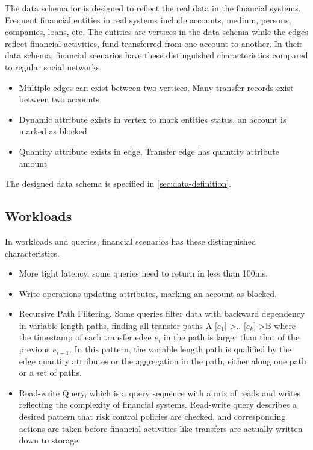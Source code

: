 The data schema for \ldbcfinbench is designed to reflect the real data in the financial systems. Frequent
financial entities in real systems include accounts, medium, persons, companies, loans, etc. The
entities are vertices in the data schema while the edges reflect financial activities, \eg fund transferred
from one account to another. In their data schema, financial scenarios have these distinguished characteristics
compared to regular social networks.
\begin{itemize}
    \item Multiple edges can exist between two vertices, \eg Many transfer records exist between two accounts
    \item Dynamic attribute exists in vertex to mark entities status, \eg an account is marked as blocked
    \item Quantity attribute exists in edge, \eg Transfer edge has quantity attribute amount
\end{itemize}

The designed data schema is specified in \autoref{sec:data-definition}.

\subsection{Workloads}

In workloads and queries, financial scenarios has these distinguished characteristics.
\begin{itemize}
    \item More tight latency, \eg some queries need to return in less than 100ms.
    \item Write operations updating attributes, \eg marking an account as blocked.
    \item Recursive Path Filtering. Some queries filter data with backward dependency
          in variable-length paths, \eg finding all transfer paths A-[${e_1}$]->..-[${e_k}$]->B
          where the timestamp of each transfer edge ${e_i}$ in the path is larger than that of
          the previous ${e_{i-1}}$. In this pattern, the variable length path is qualified by
          the edge quantity attributes or the aggregation in the path, either along one path
          or a set of paths.
    \item Read-write Query, which is a query sequence with a mix of reads and writes reflecting the
          complexity of financial systems. Read-write query describes a desired pattern that risk control
          policies are checked, and corresponding actions are taken before financial activities like
          transfers are actually written down to storage.
\end{itemize}

